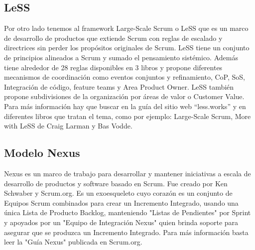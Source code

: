 \subsection{LeSS}

Por otro lado tenemos al framework Large-Scale Scrum o LeSS que  es un marco de desarrollo de productos que extiende Scrum con reglas de escalado y directrices sin perder los propósitos originales de Scrum. LeSS tiene un conjunto de principios alineados a Scrum y sumado el pensamiento sistémico. Además tiene alrededor de 28 reglas disponibles en 3 libros y propone diferentes mecanismos de coordinación como eventos conjuntos y refinamiento, CoP, SoS, Integración de código, feature teams y Area Product Owner. LeSS también propone subdivisiones de la organización por áreas de valor o Customer Value. Para más información hay que buscar en la guía del sitio web “less.works” y en diferentes libros que tratan el tema, como por ejemplo: Large-Scale Scrum, More with LeSS de Craig Larman y Bas Vodde.

\subsection{Modelo Nexus}

Nexus es un marco de trabajo para desarrollar y mantener iniciativas a escala de desarrollo de productos y software basado en Scrum. Fue creado por Ken Schwaber y Scrum.org. Es un exoesqueleto cuyo corazón es un conjunto de Equipos Scrum combinados para crear un Incremento Integrado, usando una única Lista de Producto Backlog, manteniendo "Listas de Pendientes" por Sprint y apoyados por un "Equipo de Integración Nexus" quien brinda soporte para asegurar que se produzca un Incremento Integrado. Para más información basta leer la "Guía Nexus" publicada en Scrum.org.


